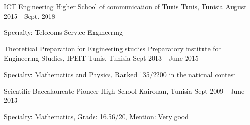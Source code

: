 

\begin{cventries}

  \cventry
    {ICT Engineering} %
    {Higher School of communication of Tunis} %
    {Tunis, Tunisia} %
    {August 2015 - Sept. 2018} %
    {
      \begin{cvitems} %
        \item { Specialty: Telecoms Service Engineering}
      \end{cvitems}
    }
    
    \cventry
    {Theoretical Preparation for Engineering studies } %
    {Preparatory institute for Engineering Studies, IPEIT} %
    {Tunis, Tunisia} %
    {Sept 2013 - June 2015} %
    {
      \begin{cvitems} %
        \item { Specialty: Mathematics and Physics, Ranked 135/2200 in the national contest}
      \end{cvitems}
    }
    
     \cventry
    {Scientific Baccalaureate} %
    {Pioneer High School} %
    {Kairouan, Tunisia} %
    {Sept 2009 - June 2013} %
    {
      \begin{cvitems} %
        \item { Specialty: Mathematics, Grade: 16.56/20, Mention: Very good }
      \end{cvitems}
    }

\end{cventries}
